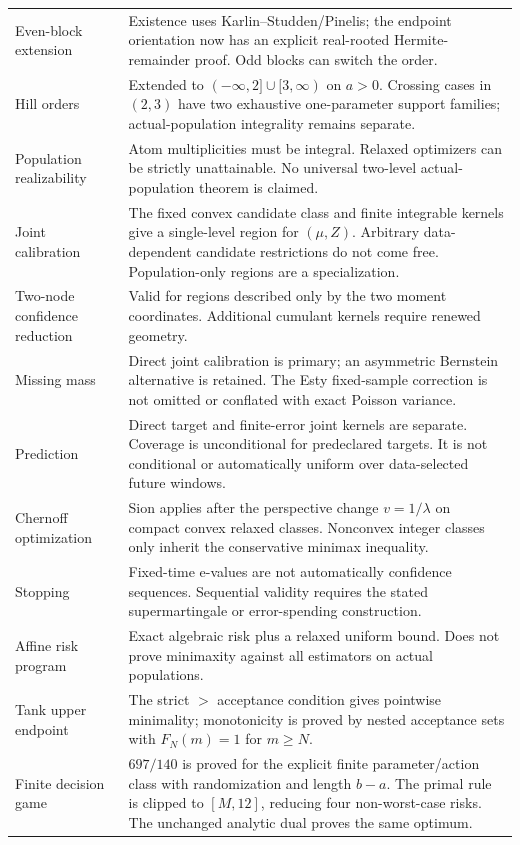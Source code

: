 \documentclass[11pt]{article}
\numberwithin{equation}{section}
\theoremstyle{definition}
\theoremstyle{remark}
\begin{document}
\begin{longtable}{@{}>{\raggedright\arraybackslash}p{}>{\raggedright\arraybackslash}p{}@{}}
Even-block extension & Existence uses Karlin--Studden/Pinelis; the endpoint orientation now has an explicit real-rooted Hermite-remainder proof. Odd blocks can switch the order.\\[4pt]
Hill orders & Extended to $(-\infty,2]\cup[3,\infty)$ on $a>0$. Crossing cases in $(2,3)$ have two exhaustive one-parameter support families; actual-population integrality remains separate.\\[4pt]
Population realizability & Atom multiplicities must be integral. Relaxed optimizers can be strictly unattainable. No universal two-level actual-population theorem is claimed.\\[4pt]
Joint calibration & The fixed convex candidate class and finite integrable kernels give a single-level region for $(\mu,Z)$. Arbitrary data-dependent candidate restrictions do not come free. Population-only regions are a specialization.\\[4pt]
Two-node confidence reduction & Valid for regions described only by the two moment coordinates. Additional cumulant kernels require renewed geometry.\\[4pt]
Missing mass & Direct joint calibration is primary; an asymmetric Bernstein alternative is retained. The Esty fixed-sample correction is not omitted or conflated with exact Poisson variance.\\[4pt]
Prediction & Direct target and finite-error joint kernels are separate. Coverage is unconditional for predeclared targets. It is not conditional or automatically uniform over data-selected future windows.\\[4pt]
Chernoff optimization & Sion applies after the perspective change $v=1/\lambda$ on compact convex relaxed classes. Nonconvex integer classes only inherit the conservative minimax inequality.\\[4pt]
Stopping & Fixed-time e-values are not automatically confidence sequences. Sequential validity requires the stated supermartingale or error-spending construction.\\[4pt]
Affine risk program & Exact algebraic risk plus a relaxed uniform bound. Does not prove minimaxity against all estimators on actual populations.\\[4pt]
Tank upper endpoint & The strict $>$ acceptance condition gives pointwise minimality; monotonicity is proved by nested acceptance sets with $F_N(m)=1$ for $m\ge N$.\\[4pt]
Finite decision game & $697/140$ is proved for the explicit finite parameter/action class with randomization and length $b-a$. The primal rule is clipped to $[M,12]$, reducing four non-worst-case risks. The unchanged analytic dual proves the same optimum.\\[4pt]

\end{longtable}
\end{document}

